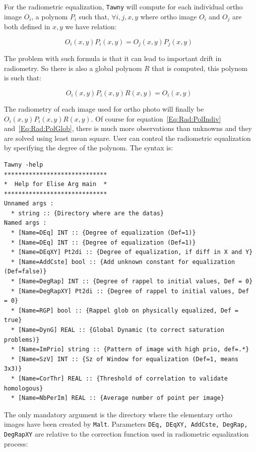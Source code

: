 For the radiometric equalization, {\tt Tawny}  will compute for each
individual ortho image $O_i$, a polynom $P_i$ such that, $\forall i,j,x,y$
where ortho image $O_i$ and $O_j$ are both defined in $x,y$ we have relation:

\begin{equation}
   O_i(x,y) P_i(x,y) = O_j(x,y) P_j(x,y)
\label{Eq:Rad:PolIndiv}
\end{equation}


The problem with such formula is that it can lead to important drift in radiometry.
So there is also a global polynom $R$ that is computed, this polynom is such that:

\begin{equation}
   O_i(x,y) P_i(x,y) R(x,y) =  O_i(x,y)
\label{Eq:Rad:PolGlob}
\end{equation}

The radiometry of each image used for ortho photo will finally be $O_i(x,y) P_i(x,y) R(x,y)$.
Of course for equation~\ref{Eq:Rad:PolIndiv} and~\ref{Eq:Rad:PolGlob}, there is
much more observations than unknowns and they are solved using least mean square.
User can control the radiometric equalization by specifying the
degree of the polynom. The syntax is:




\begin{verbatim}
Tawny -help
*****************************
*  Help for Elise Arg main  *
*****************************
Unnamed args :
  * string :: {Directory where are the datas}
Named args :
  * [Name=DEq] INT :: {Degree of equalization (Def=1)}
  * [Name=DEq] INT :: {Degree of equalization (Def=1)}
  * [Name=DEqXY] Pt2di :: {Degree of equalization, if diff in X and Y}
  * [Name=AddCste] bool :: {Add unknown constant for equalization (Def=false)}
  * [Name=DegRap] INT :: {Degree of rappel to initial values, Def = 0}
  * [Name=DegRapXY] Pt2di :: {Degree of rappel to initial values, Def = 0}
  * [Name=RGP] bool :: {Rappel glob on physically equalized, Def = true}
  * [Name=DynG] REAL :: {Global Dynamic (to correct saturation problems)}
  * [Name=ImPrio] string :: {Pattern of image with high prio, def=.*}
  * [Name=SzV] INT :: {Sz of Window for equalization (Def=1, means 3x3)}
  * [Name=CorThr] REAL :: {Threshold of correlation to validate homologous}
  * [Name=NbPerIm] REAL :: {Average number of point per image}
\end{verbatim}

The only mandatory argument is the directory where the
elementary ortho images have been created by {\tt Malt}. Parameters
{\tt DEq, DEqXY, AddCste, DegRap, DegRapXY} are relative to the correction
function used in radiometric equalization process:

